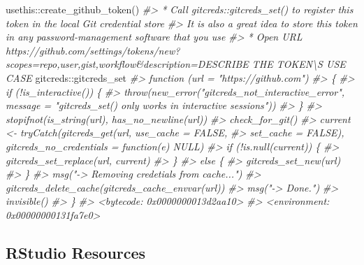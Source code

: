 \documentclass[
]{article}
\newenvironment{Shaded}{\begin{snugshade}}{\end{snugshade}}
\newcommand{\CommentTok}[1]{\textcolor[rgb]{0.56,0.35,0.01}{\textit{#1}}}
\newcommand{\FunctionTok}[1]{\textcolor[rgb]{0.00,0.00,0.00}{#1}}
\newcommand{\NormalTok}[1]{#1}
\newcommand{\SpecialCharTok}[1]{\textcolor[rgb]{0.00,0.00,0.00}{#1}}
\begin{document}
\begin{Shaded}
\begin{Highlighting}[]
\NormalTok{usethis}\SpecialCharTok{::}\FunctionTok{create\_github\_token}\NormalTok{()}
\CommentTok{\#\textgreater{} * Call \textasciigrave{}gitcreds::gitcreds\_set()\textasciigrave{} to register this token in the local Git credential store}
\CommentTok{\#\textgreater{}   It is also a great idea to store this token in any password{-}management software that you use}
\CommentTok{\#\textgreater{} * Open URL \textquotesingle{}https://github.com/settings/tokens/new?scopes=repo,user,gist,workflow\&description=DESCRIBE THE TOKEN\textbackslash{}\textquotesingle{}S USE CASE\textquotesingle{}}
\NormalTok{gitcreds}\SpecialCharTok{::}\NormalTok{gitcreds\_set}
\CommentTok{\#\textgreater{} function (url = "https://github.com") }
\CommentTok{\#\textgreater{} \{}
\CommentTok{\#\textgreater{}     if (!is\_interactive()) \{}
\CommentTok{\#\textgreater{}         throw(new\_error("gitcreds\_not\_interactive\_error", message = "\textasciigrave{}gitcreds\_set()\textasciigrave{} only works in interactive sessions"))}
\CommentTok{\#\textgreater{}     \}}
\CommentTok{\#\textgreater{}     stopifnot(is\_string(url), has\_no\_newline(url))}
\CommentTok{\#\textgreater{}     check\_for\_git()}
\CommentTok{\#\textgreater{}     current \textless{}{-} tryCatch(gitcreds\_get(url, use\_cache = FALSE, }
\CommentTok{\#\textgreater{}         set\_cache = FALSE), gitcreds\_no\_credentials = function(e) NULL)}
\CommentTok{\#\textgreater{}     if (!is.null(current)) \{}
\CommentTok{\#\textgreater{}         gitcreds\_set\_replace(url, current)}
\CommentTok{\#\textgreater{}     \}}
\CommentTok{\#\textgreater{}     else \{}
\CommentTok{\#\textgreater{}         gitcreds\_set\_new(url)}
\CommentTok{\#\textgreater{}     \}}
\CommentTok{\#\textgreater{}     msg("{-}\textgreater{} Removing credetials from cache...")}
\CommentTok{\#\textgreater{}     gitcreds\_delete\_cache(gitcreds\_cache\_envvar(url))}
\CommentTok{\#\textgreater{}     msg("{-}\textgreater{} Done.")}
\CommentTok{\#\textgreater{}     invisible()}
\CommentTok{\#\textgreater{} \}}
\CommentTok{\#\textgreater{} \textless{}bytecode: 0x0000000013d2aa10\textgreater{}}
\CommentTok{\#\textgreater{} \textless{}environment: 0x00000000131fa7e0\textgreater{}}
\end{Highlighting}
\end{Shaded}

\hypertarget{rstudio-resources}{%
\subsection{RStudio Resources}\label{rstudio-resources}}
\end{document}
